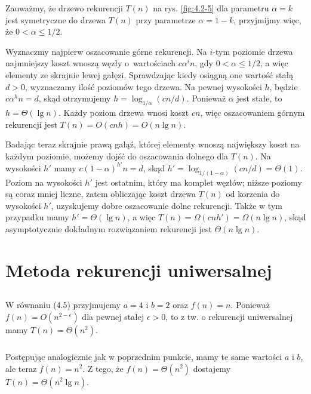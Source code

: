 Zauważmy, że drzewo rekurencji $T(n)$ na rys. \ref{fig:4.2-5} dla parametru $\alpha=k$ jest symetryczne do drzewa $T(n)$ przy parametrze $\alpha=1-k$, przyjmijmy więc, że $0<\alpha\le 1/2$.

Wyznaczmy najpierw oszacowanie górne rekurencji. Na $i$-tym poziomie drzewa najmniejszy koszt wnoszą węzły o~wartościach $c\alpha^in$, gdy $0<\alpha\le 1/2$, a więc elementy ze skrajnie lewej gałęzi. Sprawdzając kiedy osiągną one wartość stałą $d>0$, wyznaczamy ilość poziomów tego drzewa. Na pewnej wysokości $h$, będzie $c\alpha^hn=d$, skąd otrzymujemy $h=\log_{1/\alpha}(cn/d)$. Ponieważ $\alpha$ jest stałe, to $h=\Theta(\lg n)$. Każdy poziom drzewa wnosi koszt $cn$, więc oszacowaniem górnym rekurencji jest $T(n)=O(cnh)=O(n\lg n)$.

Badając teraz skrajnie prawą gałąź, której elementy wnoszą największy koszt na każdym poziomie, możemy dojść do oszacowania dolnego dla $T(n)$. Na wysokości $h'$ mamy $c(1-\alpha)^{h'}n=d$, skąd $h'=\log_{1/(1-\alpha)}(cn/d)=\Theta(1)$. Poziom na wysokości $h'$ jest ostatnim, który ma komplet węzłów; niższe poziomy są coraz mniej liczne, zatem obliczając koszt drzewa $T(n)$ od korzenia do wysokości $h'$, uzyskujemy dobre oszacowanie dolne rekurencji. Także w tym przypadku mamy $h'=\Theta(\lg n)$, a więc $T(n)=\Omega(cnh')=\Omega(n\lg n)$, skąd asymptotycznie dokładnym rozwiązaniem rekurencji jest $\Theta(n\lg n)$.

\section{Metoda rekurencji uniwersalnej}

\subsection{} %

\subsubsection{}
W równaniu (4.5) przyjmujemy $a=4$ i $b=2$ oraz $f(n)=n$. Ponieważ $f(n)=O(n^{2-\epsilon})$ dla pewnej stałej $\epsilon>0$, to z tw. o rekurencji uniwersalnej mamy $T(n)=\Theta(n^2)$.

\subsubsection{}
Postępując analogicznie jak w poprzednim punkcie, mamy te same wartości $a$ i $b$, ale teraz $f(n)=n^2$. Z tego, że $f(n)=\Theta(n^2)$ dostajemy $T(n)=\Theta(n^2\lg n)$.

